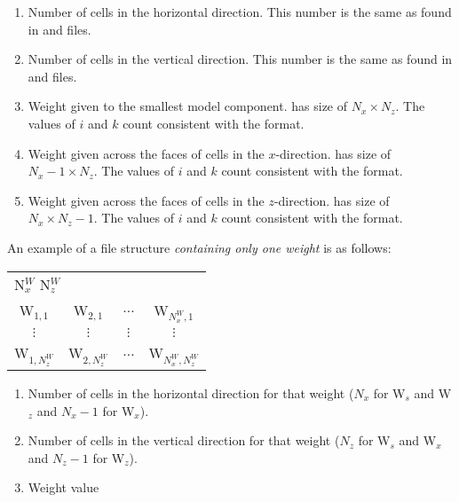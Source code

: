 \begin{enumerate}
\item[\codeName{N$_x$}] Number of cells in the horizontal direction. This number is the same as found in  and files.
\item[\codeName{N$_z$}] Number of cells in the vertical direction. This number is the same as found in  and files.
\item[\codeName{Ws$_{i,k}$ }] Weight given to the smallest model component.  has size of $N_x \times N_z$. The values of $i$ and $k$ count consistent with the  format.
\item[\codeName{Wx$_{i,k}$ }] Weight given across the faces of cells in the $x$-direction.  has size of $N_x-1 \times N_z$. The values of $i$ and $k$ count consistent with the  format.
\item[\codeName{Wz$_{i,k}$ }] Weight given across the faces of cells in the $z$-direction.  has size of $N_x \times N_z-1$. The values of $i$ and $k$ count consistent with the  format.
\end{enumerate}

An example of a  file structure \textit{containing only one weight} is as follows:

\begin{fileExample}
\begin{tabular}{|cccc|}
\hline
\multicolumn{4}{|l|}{N$^W_x$ N$^W_z$} \\
W$_{1,1}$ & W$_{2,1}$ & $\hdots$ & W$_{N^W_x,1}$ \\
$\vdots$ &  $\vdots$ &  $\vdots$ &  $\vdots$ \\
W$_{1,N^W_z}$ & W$_{2,N^W_z}$ & $\hdots$ & W$_{N^W_x,N^W_z}$ \\
\hline
\end{tabular}
\end{fileExample}

\begin{enumerate}
\item[\codeName{N$^W_x$}] Number of cells in the horizontal direction for that weight ($N_x$ for W$_s$ and W$_z$ and $N_x-1$ for W$_x$).
\item[\codeName{N$^W_z$}] Number of cells in the vertical direction for that weight ($N_z$ for W$_s$ and W$_x$ and $N_z-1$ for W$_z$).
\item[\codeName{W$_{i,k}$ }] Weight value
\end{enumerate}

